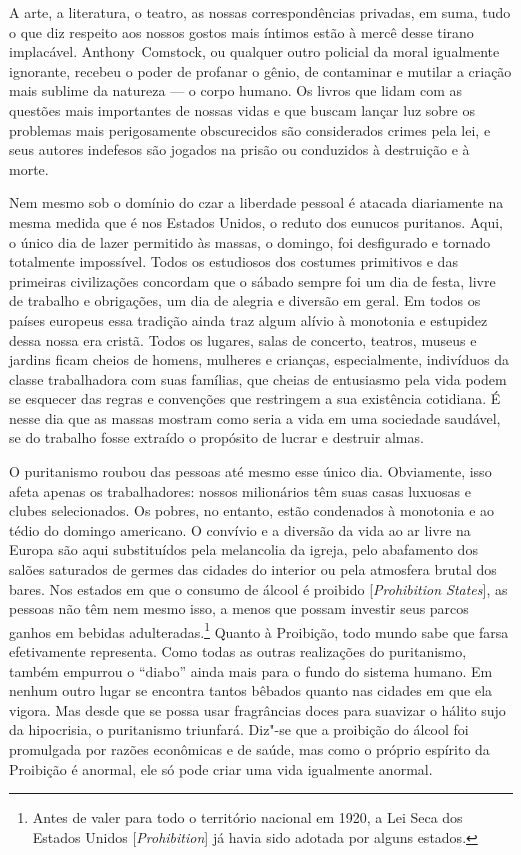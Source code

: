 A arte, a literatura, o teatro, as nossas correspondências privadas, em
suma, tudo o que diz respeito aos nossos gostos mais íntimos estão à
mercê desse tirano implacável. Anthony~Comstock, ou qualquer outro
policial da moral igualmente ignorante, recebeu o poder de profanar o
gênio, de contaminar e mutilar a criação mais sublime da natureza --- o
corpo humano. Os livros que lidam com as questões mais importantes de
nossas vidas e que buscam lançar luz sobre os problemas mais
perigosamente obscurecidos são considerados crimes pela lei, e seus
autores indefesos são jogados na prisão ou conduzidos à destruição e à
morte.

Nem mesmo sob o domínio do czar a liberdade pessoal é atacada
diariamente na mesma medida que é nos Estados Unidos, o reduto dos
eunucos puritanos. Aqui, o único dia de lazer permitido às massas, o
domingo, foi desfigurado e tornado totalmente impossível. Todos os
estudiosos dos costumes primitivos e das primeiras civilizações
concordam que o sábado sempre foi um dia de festa, livre de trabalho e
obrigações, um dia de alegria e diversão em geral. Em todos os países
europeus essa tradição ainda traz algum alívio à monotonia e estupidez
dessa nossa era cristã. Todos os lugares, salas de concerto, teatros, %
museus e jardins ficam cheios de homens, mulheres e crianças,
especialmente, indivíduos da classe trabalhadora com suas famílias, que
cheias de entusiasmo pela vida podem se esquecer das regras e convenções
que restringem a sua existência cotidiana. É nesse dia que as massas
mostram como seria a vida em uma sociedade saudável, se do trabalho
fosse extraído o propósito de lucrar e destruir almas.

O puritanismo roubou das pessoas até mesmo esse único dia. Obviamente,
isso afeta apenas os trabalhadores: nossos milionários têm suas casas
luxuosas e clubes selecionados. Os pobres, no entanto, estão condenados
à monotonia e ao tédio do domingo americano. O convívio e a diversão da
vida ao ar livre na Europa são aqui substituídos pela melancolia da
igreja, pelo abafamento dos salões saturados de germes das cidades do
interior ou pela atmosfera brutal dos bares. Nos estados em que o
consumo de álcool é proibido {[}\emph{Prohibition States}{]}, as pessoas
não têm nem mesmo isso, a menos que possam investir seus parcos ganhos
em bebidas adulteradas.\footnote{Antes de valer para todo o território
  nacional em 1920, a Lei Seca dos Estados Unidos
  {[}\emph{Prohibition}{]} já havia sido adotada por alguns estados.}
Quanto à Proibição, todo mundo sabe que farsa efetivamente representa.
Como todas as outras realizações do puritanismo, também empurrou o
``diabo'' ainda mais para o fundo do sistema humano. Em nenhum outro
lugar se encontra tantos bêbados quanto nas cidades em que ela vigora. 
Mas desde que se possa usar fragrâncias doces para suavizar o
hálito sujo da hipocrisia, o puritanismo triunfará. Diz"-se que a
proibição do álcool foi promulgada por razões econômicas e de saúde, mas
como o próprio espírito da Proibição é anormal, ele só pode criar uma
vida igualmente anormal.

